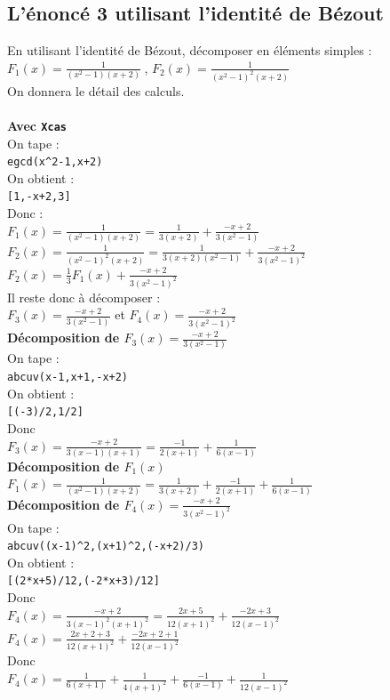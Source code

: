 \documentclass[a4paper,11pt]{book}
\begin{document}
\subsection{L'\'enonc\'e 3  utilisant l'identit\'e de B\'ezout}
En utilisant l'identit\'e de B\'ezout, d\'ecomposer en \'el\'ements simples :\\
$F_1(x)=\displaystyle \frac{1}{(x^2-1)(x+2)}\ $,
$F_2(x)=\displaystyle \frac{1}{(x^2-1)^2(x+2)}$\\
On donnera le d\'etail des calculs. \\
\ \\
{\bf Avec {\tt Xcas}}\\
On tape :\\
{\tt egcd(x\verb|^|2-1,x+2)}\\
On obtient :\\
{\tt [1,-x+2,3]}\\
Donc :\\
$\displaystyle  F_1(x)=\frac{1}{(x^2-1)(x+2)}=\frac{1}{3(x+2)}+\frac{-x+2}{3(x^2-1)}$\\
$\displaystyle F_2(x)=\frac{1}{(x^2-1)^2(x+2)}=\frac{1}{3(x+2)(x^2-1)}+\frac{-x+2}{3(x^2-1)^2}$\\
$\displaystyle F_2(x)=\frac{1}{3}F_1(x)+\frac{-x+2}{3(x^2-1)^2}$\\ 
Il reste donc \`a d\'ecomposer :\\
$\displaystyle F_3(x)=\frac{-x+2}{3(x^2-1)}$ et 
$\displaystyle F_4(x)=\frac{-x+2}{3(x^2-1)^2}$\\ 

{\bf D\'ecomposition de $\displaystyle F_3(x)=\frac{-x+2}{3(x^2-1)}$}\\
On tape :\\
{\tt abcuv(x-1,x+1,-x+2)}\\
On obtient :\\
{\tt [(-3)/2,1/2]}\\
Donc \\
$\displaystyle F_3(x)=\frac{-x+2}{3(x-1)(x+1)}=\frac{-1}{2(x+1)}+\frac{1}{6(x-1)}$\\

{\bf D\'ecomposition de  $F_1(x)$}\\
$\displaystyle F_1(x)=\frac{1}{(x^2-1)(x+2)}=\frac{1}{3(x+2)}+\frac{-1}{2(x+1)}+\frac{1}{6(x-1)}$\\

{\bf D\'ecomposition de $\displaystyle F_4(x)=\frac{-x+2}{3(x^2-1)^2}$}\\
On tape :\\
{\tt abcuv((x-1)\verb|^|2,(x+1)\verb|^|2,(-x+2)/3)}\\
On obtient :\\
{\tt [(2*x+5)/12,(-2*x+3)/12]}\\
Donc \\
$\displaystyle  F_4(x)=\frac{-x+2}{3(x-1)^2(x+1)^2}=\frac{2x+5}{12(x+1)^2}+\frac{-2x+3}{12(x-1)^2}$ \\
$\displaystyle  F_4(x)=\frac{2x+2+3}{12(x+1)^2}+\frac{-2x+2+1}{12(x-1)^2}$\\
Donc \\
$\displaystyle F_4(x)=\frac{1}{6(x+1)}+\frac{1}{4(x+1)^2}+\frac{-1}{6(x-1)}+\frac{1}{12(x-1)^2}$\\
 
\end{document}
